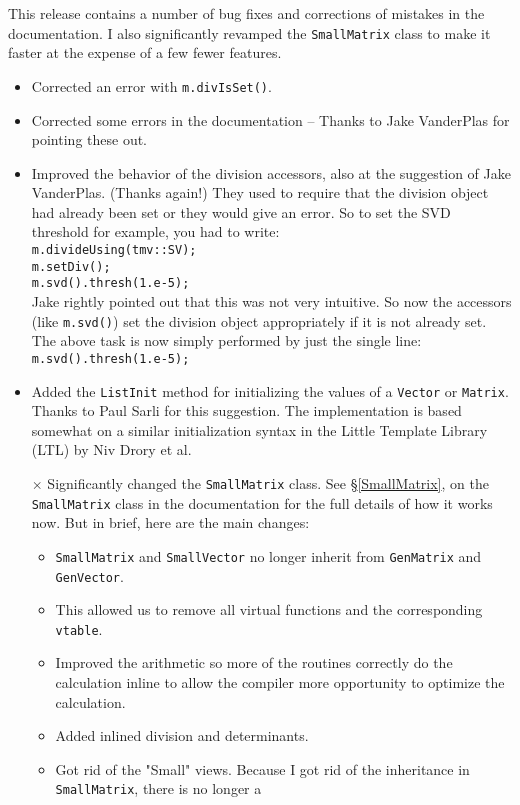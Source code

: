 \documentclass[twoside,letterpaper,11pt]{article}
\renewcommand{\tt}[1]{{\lstinline {#1}}}
\begin{document}
\begin{description}
This release contains a number of bug fixes and corrections of mistakes in the documentation.
I also significantly revamped the \tt{SmallMatrix} class to make it faster at the expense of a few fewer 
features.  
\begin{itemize}
\item
Corrected an error with \tt{m.divIsSet()}.
\item
Corrected some errors in the documentation -- Thanks to Jake VanderPlas for pointing these out.
\item
Improved the behavior of the division accessors, also at the suggestion of Jake VanderPlas. (Thanks again!)  They used to require that the division
object had already been set or they would give an error.  So to set the SVD threshold for example,
you had to write:\\
\tt{m.divideUsing(tmv::SV);}\\
\tt{m.setDiv();}\\
\tt{m.svd().thresh(1.e-5);}\\
Jake rightly pointed out that this was not very intuitive.  So now the accessors (like \tt{m.svd()}) set
the division object appropriately if it is not already set.  The above task is now simply performed
by just the single line:\\
\tt{m.svd().thresh(1.e-5);}
\item
Added the \tt{ListInit} method for initializing the values of a \tt{Vector} or \tt{Matrix}.  Thanks to Paul
Sarli for this suggestion.  The implementation is based somewhat on a similar 
initialization syntax in the Little Template Library (LTL) by Niv Drory et al.
\item[$\times$]
Significantly changed the \tt{SmallMatrix} class.  See \S\ref{SmallMatrix}, on the \tt{SmallMatrix} class 
in the documentation
for the full details of how it works now.  But in brief, here are the main changes:
\begin{itemize}
\item \tt{SmallMatrix} and \tt{SmallVector} no longer inherit from \tt{GenMatrix} and \tt{GenVector}.
\item This allowed us to remove all virtual functions and the corresponding \tt{vtable}.
\item Improved the arithmetic so more of the routines correctly do the calculation inline to allow the
compiler more opportunity to optimize the calculation.
\item Added inlined division and determinants.
\item Got rid of the "Small" views.  Because I got rid of the inheritance in \tt{SmallMatrix}, there is no longer a 

\end{itemize}
\end{itemize}
\end{description}
\end{document}
